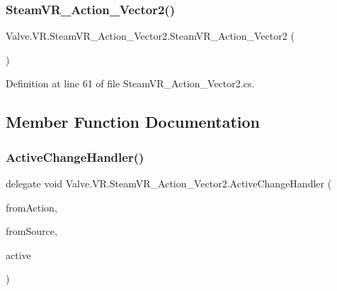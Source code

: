 \subsubsection{\texorpdfstring{SteamVR\_Action\_Vector2()}{SteamVR\_Action\_Vector2()}}
{\footnotesize\ttfamily Valve.\+V\+R.\+Steam\+V\+R\+\_\+\+Action\+\_\+\+Vector2.\+Steam\+V\+R\+\_\+\+Action\+\_\+\+Vector2 (\begin{DoxyParamCaption}{ }\end{DoxyParamCaption})}



Definition at line 61 of file Steam\+V\+R\+\_\+\+Action\+\_\+\+Vector2.\+cs.



\subsection{Member Function Documentation}
\mbox{\label{class_valve_1_1_v_r_1_1_steam_v_r___action___vector2_ad01c83284de71c0d9cd8f7e673ce5ab5}} 
\subsubsection{\texorpdfstring{ActiveChangeHandler()}{ActiveChangeHandler()}}
{\footnotesize\ttfamily delegate void Valve.\+V\+R.\+Steam\+V\+R\+\_\+\+Action\+\_\+\+Vector2.\+Active\+Change\+Handler (\begin{DoxyParamCaption}\item[{\mbox{\hyperlink{class_valve_1_1_v_r_1_1_steam_v_r___action___vector2}{Steam\+V\+R\+\_\+\+Action\+\_\+\+Vector2}}}]{from\+Action,  }\item[{\mbox{\hyperlink{namespace_valve_1_1_v_r_a82e5bf501cc3aa155444ee3f0662853f}{Steam\+V\+R\+\_\+\+Input\+\_\+\+Sources}}}]{from\+Source,  }\item[{bool}]{active }\end{DoxyParamCaption})}

\mbox{\label{class_valve_1_1_v_r_1_1_steam_v_r___action___vector2_a9ad74daee25b567d8961cd28d5357008}} 
